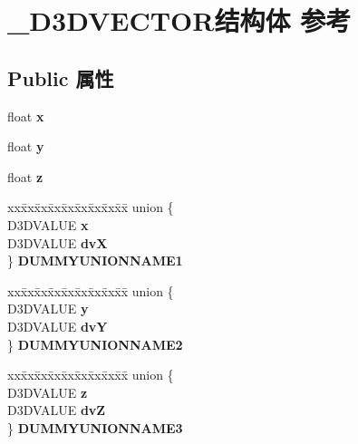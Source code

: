 \hypertarget{struct___d3_d_v_e_c_t_o_r}{}\section{\+\_\+\+D3\+D\+V\+E\+C\+T\+O\+R结构体 参考}
\label{struct___d3_d_v_e_c_t_o_r}
\subsection*{Public 属性}
\begin{DoxyCompactItemize}
\item 
\mbox{\label{struct___d3_d_v_e_c_t_o_r_a927e1164122030a3dccd4f69fc1127f0}} 
float {\bfseries x}
\item 
\mbox{\label{struct___d3_d_v_e_c_t_o_r_abd365f8fd246cb0a51e240c2d3dbcd21}} 
float {\bfseries y}
\item 
\mbox{\label{struct___d3_d_v_e_c_t_o_r_adda9ba325854ea6e0aec6d829a4342e2}} 
float {\bfseries z}
\item 
\mbox{\label{struct___d3_d_v_e_c_t_o_r_a1ecd3c176df4581efe47f50d75ab07b5}} 
\begin{tabbing}
xx\=xx\=xx\=xx\=xx\=xx\=xx\=xx\=xx\=\kill
union \{\\
\>D3DVALUE {\bfseries x}\\
\>D3DVALUE {\bfseries dvX}\\
\} {\bfseries DUMMYUNIONNAME1}\\

\end{tabbing}\item 
\mbox{\label{struct___d3_d_v_e_c_t_o_r_ac358b8b3a4b76cfbe3d7349a5d2cef03}} 
\begin{tabbing}
xx\=xx\=xx\=xx\=xx\=xx\=xx\=xx\=xx\=\kill
union \{\\
\>D3DVALUE {\bfseries y}\\
\>D3DVALUE {\bfseries dvY}\\
\} {\bfseries DUMMYUNIONNAME2}\\

\end{tabbing}\item 
\mbox{\label{struct___d3_d_v_e_c_t_o_r_a7336b254a9aa1a6d3131b9f4830627ca}} 
\begin{tabbing}
xx\=xx\=xx\=xx\=xx\=xx\=xx\=xx\=xx\=\kill
union \{\\
\>D3DVALUE {\bfseries z}\\
\>D3DVALUE {\bfseries dvZ}\\
\} {\bfseries DUMMYUNIONNAME3}\\

\end{tabbing}\end{DoxyCompactItemize}


